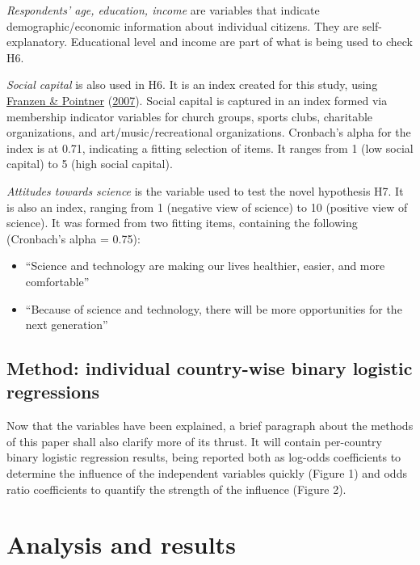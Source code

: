 \documentclass[
  12pt,
  english,
]{article}
\providecommand{\tightlist}{%
  \setlength{\itemsep}{0pt}\setlength{\parskip}{0pt}}
\begin{document}
\emph{Respondents' age, education, income} are variables that indicate
demographic/economic information about individual citizens. They are
self-explanatory. Educational level and income are part of what is being
used to check H6.

\emph{Social capital} is also used in H6. It is an index created for
this study, using
\protect\hyperlink{ref-franzen2007sozialkapital}{Franzen \& Pointner}
(\protect\hyperlink{ref-franzen2007sozialkapital}{2007}). Social capital
is captured in an index formed via membership indicator variables for
church groups, sports clubs, charitable organizations, and
art/music/recreational organizations. Cronbach's alpha for the index is
at 0.71, indicating a fitting selection of items. It ranges from 1 (low
social capital) to 5 (high social capital).

\emph{Attitudes towards science} is the variable used to test the novel
hypothesis H7. It is also an index, ranging from 1 (negative view of
science) to 10 (positive view of science). It was formed from two
fitting items, containing the following (Cronbach's alpha = 0.75):

\begin{itemize}
\tightlist
\item
  ``Science and technology are making our lives healthier, easier, and
  more comfortable''
\item
  ``Because of science and technology, there will be more opportunities
  for the next generation''
\end{itemize}

\hypertarget{method-individual-country-wise-binary-logistic-regressions}{%
\subsection{Method: individual country-wise binary logistic
regressions}\label{method-individual-country-wise-binary-logistic-regressions}}

Now that the variables have been explained, a brief paragraph about the
methods of this paper shall also clarify more of its thrust. It will
contain per-country binary logistic regression results, being reported
both as log-odds coefficients to determine the influence of the
independent variables quickly (Figure 1) and odds ratio coefficients to
quantify the strength of the influence (Figure 2).

\hypertarget{analysis-and-results}{%
\section{Analysis and results}\label{analysis-and-results}}
\end{document}
